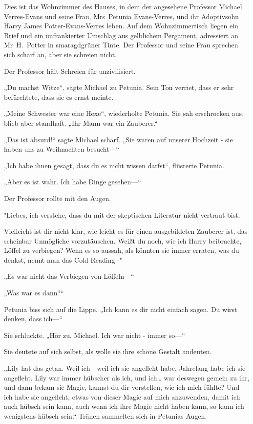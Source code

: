{Dies ist das Wohnzimmer des Hauses, in dem der angesehene Professor Michael Verres-Evans und seine Frau, Mrs~Petunia Evans-Verres, und ihr Adoptivsohn Harry James Potter-Evans-Verres leben. Auf dem Wohnzimmertisch liegen ein Brief und ein unfrankierter Umschlag aus gelblichem Pergament, adressiert an Mr~H.~Potter in smaragdgrüner Tinte. Der Professor und seine Frau sprechen sich scharf an, aber sie schreien nicht.

Der Professor hält Schreien für unzivilisiert.

„Du machst Witze“, sagte Michael zu Petunia. Sein Ton verriet, dass er sehr befürchtete, dass sie es ernst meinte.

„Meine Schwester war eine Hexe“, wiederholte Petunia. Sie sah erschrocken aus, blieb aber standhaft. „Ihr Mann war ein Zauberer.“

„Das ist absurd!“ sagte Michael scharf. „Sie waren auf unserer Hochzeit - sie haben uns zu Weihnachten besucht—“

„Ich habe ihnen gesagt, dass du es nicht wissen darfst“, flüsterte Petunia.

„Aber es ist wahr. Ich habe Dinge gesehen—“

Der Professor rollte mit den Augen.

"Liebes, ich verstehe, dass du mit der skeptischen Literatur nicht vertraut bist.

Vielleicht ist dir nicht klar, wie leicht es für einen ausgebildeten Zauberer ist, das scheinbar Unmögliche vorzutäuschen. Weißt du noch, wie ich Harry beibrachte, Löffel zu verbiegen? Wenn es so aussah, als könnten sie immer erraten, was du denkst, nennt man das Cold Reading -"

„Es war nicht das Verbiegen von Löffeln—“

„Was war es dann?“

Petunia biss sich auf die Lippe. „Ich kann es dir nicht einfach sagen. Du wirst denken, dass ich—“

Sie schluckte. „Hör zu. Michael. Ich war nicht - immer so—“

Sie deutete auf sich selbst, als wolle sie ihre schöne Gestalt andeuten.

„Lily hat das getan. Weil ich - weil ich sie angefleht habe. Jahrelang habe ich sie angefleht. Lily war immer hübscher als ich, und ich… war deswegen gemein zu ihr, und dann bekam sie Magie, kannst du dir vorstellen, wie ich mich fühlte? Und ich habe sie angefleht, etwas von dieser Magie auf mich anzuwenden, damit ich auch hübsch sein kann, auch wenn ich ihre Magie nicht haben kann, so kann ich wenigstens hübsch sein.“ Tränen sammelten sich in Petunias Augen.

}

